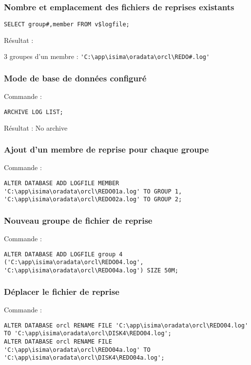 \subsubsection{Nombre et emplacement des fichiers de reprises existants}

\begin{verbatim}
SELECT group#,member FROM v$logfile;
\end{verbatim}

Résultat : 

3 groupes d'un membre :  \verb|'C:\app\isima\oradata\orcl\REDO#.log'|

\subsubsection{Mode de base de données configuré}

Commande :
\begin{verbatim}
ARCHIVE LOG LIST;
\end{verbatim}

Résultat : No archive

\subsubsection{Ajout d'un membre de reprise pour chaque groupe}

Commande : 
\begin{verbatim}
ALTER DATABASE ADD LOGFILE MEMBER 'C:\app\isima\oradata\orcl\REDO01a.log' TO GROUP 1, 'C:\app\isima\oradata\orcl\REDO02a.log' TO GROUP 2;
\end{verbatim}

\subsubsection{Nouveau groupe de fichier de reprise}

Commande : 
\begin{verbatim}
ALTER DATABASE ADD LOGFILE group 4 ('C:\app\isima\oradata\orcl\REDO04.log', 'C:\app\isima\oradata\orcl\REDO04a.log') SIZE 50M;
\end{verbatim}

\subsubsection{Déplacer le fichier de reprise}

Commande : 
\begin{verbatim}
ALTER DATABASE orcl RENAME FILE 'C:\app\isima\oradata\orcl\REDO04.log' TO 'C:\app\isima\oradata\orcl\DISK4\REDO04.log';
ALTER DATABASE orcl RENAME FILE 'C:\app\isima\oradata\orcl\REDO04a.log' TO 'C:\app\isima\oradata\orcl\DISK4\REDO04a.log';
\end{verbatim}

